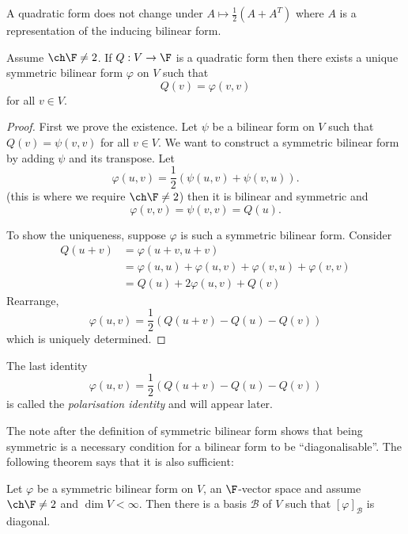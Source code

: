\documentclass[a4paper]{article}
\newcommand*{\basis}{\mathcal}
\theoremstyle{definition}
\begin{document}
\begin{remark}
  A quadratic form does not change under \(A \mapsto \frac{1}{2}(A + A^T)\) where \(A\) is a representation of the inducing bilinear form.
\end{remark}

\begin{proposition}
  Assume \(\ch \F \neq 2\). If \(Q: V \to \F\) is a quadratic form then there exists a unique symmetric bilinear form \(\varphi\) on \(V\) such that
  \[
    Q(v) = \varphi(v, v)
  \]
  for all \(v \in V\).
\end{proposition}

\begin{proof}
  First we prove the existence. Let \(\psi\) be a bilinear form on \(V\) such that \(Q(v) = \psi(v, v)\) for all \(v \in V\). We want to construct a symmetric bilinear form by adding \(\psi\) and its transpose. Let
  \[
    \varphi(u, v) = \frac{1}{2}(\psi(u, v) + \psi(v, u)).
  \]
  (this is where we require \(\ch \F \neq 2\)) then it is bilinear and symmetric and
  \[
    \varphi(v, v) = \psi(v, v) = Q(u).
  \]

  To show the uniqueness, suppose \(\varphi\) is such a symmetric bilinear form. Consider
  \begin{align*}
    Q(u + v) &= \varphi(u + v, u + v) \\
             &= \varphi(u, u) + \varphi(u, v) + \varphi(v, u) + \varphi(v, v) \\
             &= Q(u) + 2\varphi(u, v) + Q(v)
  \end{align*}
  Rearrange,
  \[
    \varphi(u, v) = \frac{1}{2}(Q(u + v) - Q(u) - Q(v))
  \]
  which is uniquely determined.
\end{proof}

\begin{remark}
  The last identity
  \[
    \varphi(u, v) = \frac{1}{2}(Q(u + v) - Q(u) - Q(v))
  \]
  is called the \emph{polarisation identity} and will appear later.
\end{remark}

The note after the definition of symmetric bilinear form shows that being symmetric is a necessary condition for a bilinear form to be ``diagonalisable''. The following theorem says that it is also sufficient:

\begin{theorem}
  Let \(\varphi\) be a symmetric bilinear form on \(V\), an \(\F\)-vector space and assume \(\ch \F \neq 2\) and \(\dim V < \infty\). Then there is a basis \(\basis B\) of \(V\) such that \([\varphi]_{\basis B}\) is diagonal.
\end{theorem}
\end{document}
